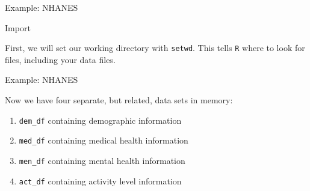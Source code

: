 \begin{frame}[fragile]{Example: NHANES}

\begin{block}{Import}

First, we will set our working directory with \texttt{setwd}. This tells
\texttt{R} where to look for files, including your data files.

\begin{Shaded}
\begin{Highlighting}[]
\NormalTok{(}\NormalTok{)}
\end{Highlighting}
\end{Shaded}

\begin{Shaded}
\begin{Highlighting}[]
\StringTok{ }\NormalTok{(}\NormalTok{)}
\StringTok{ }\NormalTok{(}\NormalTok{)}
\StringTok{ }\NormalTok{(}\NormalTok{)}
\StringTok{ }\NormalTok{(}\NormalTok{)}
\end{Highlighting}
\end{Shaded}

\end{block}

\end{frame}

\begin{frame}[fragile]{Example: NHANES}

Now we have four separate, but related, data sets in memory:

\begin{enumerate}
\def\labelenumi{\arabic{enumi}.}
\tightlist
\item
  \texttt{dem\_df} containing demographic information
\item
  \texttt{med\_df} containing medical health information
\item
  \texttt{men\_df} containing mental health information
\item
  \texttt{act\_df} containing activity level information
\end{enumerate}

\end{frame}

